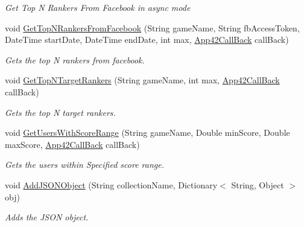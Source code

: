 \begin{DoxyCompactItemize}
\begin{DoxyCompactList}\small\item\em Get Top N Rankers From Facebook in async mode \end{DoxyCompactList}\item 
void \hyperlink{classcom_1_1shephertz_1_1app42_1_1paas_1_1sdk_1_1csharp_1_1game_1_1_score_board_service_a410c98997e197c761081f133ddfe8055}{Get\+Top\+N\+Rankers\+From\+Facebook} (String game\+Name, String fb\+Access\+Token, Date\+Time start\+Date, Date\+Time end\+Date, int max, \hyperlink{interfacecom_1_1shephertz_1_1app42_1_1paas_1_1sdk_1_1csharp_1_1_app42_call_back}{App42\+Call\+Back} call\+Back)
\begin{DoxyCompactList}\small\item\em Gets the top N rankers from facebook. \end{DoxyCompactList}\item 
void \hyperlink{classcom_1_1shephertz_1_1app42_1_1paas_1_1sdk_1_1csharp_1_1game_1_1_score_board_service_a001d5ae6533da63e1f2a092eef5f4013}{Get\+Top\+N\+Target\+Rankers} (String game\+Name, int max, \hyperlink{interfacecom_1_1shephertz_1_1app42_1_1paas_1_1sdk_1_1csharp_1_1_app42_call_back}{App42\+Call\+Back} call\+Back)
\begin{DoxyCompactList}\small\item\em Gets the top N target rankers. \end{DoxyCompactList}\item 
void \hyperlink{classcom_1_1shephertz_1_1app42_1_1paas_1_1sdk_1_1csharp_1_1game_1_1_score_board_service_a3a2d82465f23b562528ff570a4e3eea2}{Get\+Users\+With\+Score\+Range} (String game\+Name, Double min\+Score, Double max\+Score, \hyperlink{interfacecom_1_1shephertz_1_1app42_1_1paas_1_1sdk_1_1csharp_1_1_app42_call_back}{App42\+Call\+Back} call\+Back)
\begin{DoxyCompactList}\small\item\em Gets the users within Specified score range. \end{DoxyCompactList}\item 
void \hyperlink{classcom_1_1shephertz_1_1app42_1_1paas_1_1sdk_1_1csharp_1_1game_1_1_score_board_service_a290faa79959c5cdc5f92cc6158177ba8}{Add\+J\+S\+O\+N\+Object} (String collection\+Name, Dictionary$<$ String, Object $>$ obj)
\begin{DoxyCompactList}\small\item\em Adds the J\+S\+O\+N object. \end{DoxyCompactList}\end{DoxyCompactItemize}
